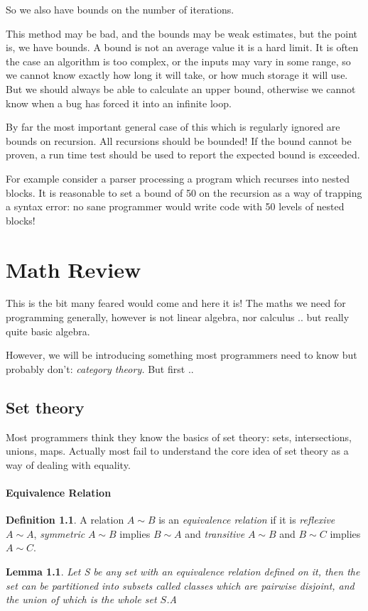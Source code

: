 \documentclass[oneside]{book}
\theoremstyle{plain}
\theoremstyle{definition}
\newtheorem{definition}{Definition}
\theoremstyle{plain}
\newtheorem{lemma}{Lemma}
\begin{document}
So we also have bounds on the number of iterations.

This method may be bad, and the bounds may be weak estimates,
but the point is, we have bounds. A bound is not an average
value it is a hard limit. It is often the case an algorithm is
too complex, or the inputs may vary in some range, so we
cannot know exactly how long it will take, or how much storage it
will use. But we should always be able to calculate an upper bound,
otherwise we cannot know when a bug has forced it into an infinite
loop.

By far the most important general case of this which is regularly
ignored are bounds on recursion. All recursions should be bounded!
If the bound cannot be proven, a run time test should be used
to report the expected bound is exceeded.

For example consider a parser processing a program which recurses
into nested blocks. It is reasonable to set a bound of 50 on
the recursion as a way of trapping a syntax error: no sane
programmer would write code with 50 levels of nested blocks!



\chapter{Math Review}
This is the bit many feared would come and here it is!
The maths we need for programming generally, however
is not linear algebra, nor calculus .. but really quite
basic algebra.

However, we will be introducing something most programmers
need to know but probably don't: {\em category theory.}
But first ..

\section{Set theory}
Most programmers think they know the basics of set theory:
sets, intersections, unions, maps. Actually most fail to
understand the core idea of set theory as a way of dealing
with equality.

\subsubsection{Equivalence Relation}
\begin{definition}
A relation $A\sim B$ is an {\em equivalence relation}
if it is {\em reflexive} $A\sim A$, {\em symmetric} $A\sim B$ implies
$B\sim A$ and {\em transitive} $A\sim B$ and $B\sim C$ implies $A\sim C$.
\end{definition}
\begin{lemma}
Let S be any set with an equivalence relation defined
on it, then the set can be {\em partitioned} into subsets
called {\em classes} which are pairwise disjoint,
and the union of which is the whole set $S$.A
\end{lemma}
\end{document}
